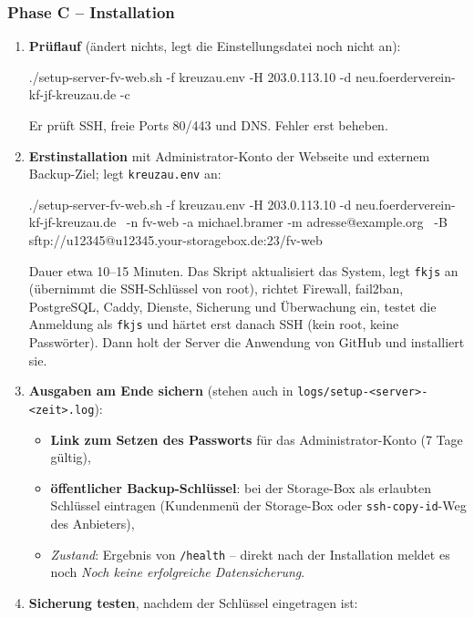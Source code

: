 \documentclass[a4paper,fontsize=10pt]{scrartcl}
\newcommand*{\cmd}[1]{\texttt{#1}}
\newcommand*{\pfad}[1]{\texttt{#1}}
\newcommand*{\erledigt}{\makebox[1.4em][l]{\setlength{\fboxsep}{0pt}\fbox{\rule{0pt}{0.7em}\hspace{0.7em}}}}
\begin{document}
\subsubsection*{Phase C -- Installation}

\begin{enumerate}[resume]
  \item \erledigt\textbf{Prüflauf} (ändert nichts, legt die Einstellungsdatei noch nicht an):
\begin{befehl}
./setup-server-fv-web.sh -f kreuzau.env -H 203.0.113.10 -d neu.foerderverein-kf-jf-kreuzau.de -c
\end{befehl}
        Er prüft SSH, freie Ports 80/443 und DNS. Fehler erst beheben.
  \item \erledigt\textbf{Erstinstallation} mit Administrator-Konto der Webseite und
        externem Backup-Ziel; legt \pfad{kreuzau.env} an:
\begin{befehl}
./setup-server-fv-web.sh -f kreuzau.env -H 203.0.113.10 -d neu.foerderverein-kf-jf-kreuzau.de \
    -n fv-web -a michael.bramer -m adresse@example.org \
    -B sftp://u12345@u12345.your-storagebox.de:23/fv-web
\end{befehl}
        Dauer etwa 10--15 Minuten. Das Skript aktualisiert das System, legt \cmd{fkjs}
        an (übernimmt die SSH-Schlüssel von root), richtet Firewall, fail2ban,
        PostgreSQL, Caddy, Dienste, Sicherung und Überwachung ein, testet die
        Anmeldung als \cmd{fkjs} und härtet erst danach SSH (kein root, keine
        Passwörter). Dann holt der Server die Anwendung von GitHub und installiert sie.
  \item \erledigt\textbf{Ausgaben am Ende sichern} (stehen auch in
        \pfad{logs/setup-<server>-<zeit>.log}):
    \begin{itemize}
      \item \textbf{Link zum Setzen des Passworts} für das Administrator-Konto
            (7 Tage gültig),
      \item \textbf{öffentlicher Backup-Schlüssel}: bei der Storage-Box als erlaubten
            Schlüssel eintragen (Kundenmenü der Storage-Box oder
            \cmd{ssh-copy-id}-Weg des Anbieters),
      \item \emph{Zustand}: Ergebnis von \cmd{/health} -- direkt nach der Installation
            meldet es noch \emph{Noch keine erfolgreiche Datensicherung}.
    \end{itemize}
  \item \erledigt\textbf{Sicherung testen}, nachdem der Schlüssel eingetragen ist:

\end{enumerate}
\end{document}
